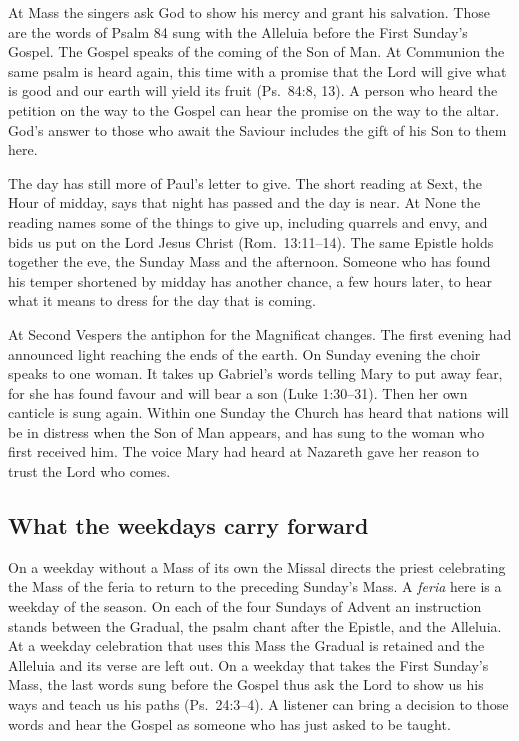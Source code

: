 At Mass the singers ask God to show his mercy and grant his salvation.
Those are the words of Psalm 84 sung with the Alleluia before the
First Sunday's Gospel. The Gospel speaks of the coming of the Son of
Man. At Communion the same psalm is heard again, this time with a
promise that the Lord will give what is good and our earth will
yield its fruit (Ps.~84:8, 13). A person who heard the petition on
the way to the Gospel can hear the promise on the way to the altar.
God's answer to those who await the Saviour includes the gift of his
Son to them here.

The day has still more of Paul's letter to give. The short reading
at Sext, the Hour of midday, says that night has passed and the day
is near. At None the reading names some of the things to give up,
including quarrels and envy, and bids us put on the Lord Jesus
Christ (Rom.~13:11--14). The same Epistle holds together the eve,
the Sunday Mass and the afternoon. Someone who has found his temper
shortened by midday has another chance, a few hours later, to hear
what it means to dress for the day that is coming.

At Second Vespers the antiphon for the Magnificat changes. The
first evening had announced light reaching the ends of the earth.
On Sunday evening the choir speaks to one woman. It takes up
Gabriel's words telling Mary to put away fear, for she has found
favour and will bear a son (Luke 1:30--31). Then her own canticle is
sung again. Within one Sunday the Church has heard that nations will
be in distress when the Son of Man appears, and has sung to the
woman who first received him. The voice Mary had heard at Nazareth
gave her reason to trust the Lord who comes.

\subsection{What the weekdays carry forward}

On a weekday without a Mass of its own the Missal directs the priest
celebrating the Mass of the feria to return to the preceding Sunday's
Mass. A \emph{feria} here is a weekday of the season. On each of the
four Sundays of Advent an instruction stands between the Gradual,
the psalm chant after the Epistle, and the Alleluia. At a weekday
celebration that uses this Mass the Gradual is retained and the
Alleluia and its verse are left out. On a weekday that takes the
First Sunday's Mass, the last words sung before the Gospel thus ask
the Lord to show us his ways and teach us his paths (Ps.~24:3--4).
A listener can bring a decision to those words and hear the Gospel
as someone who has just asked to be taught.

